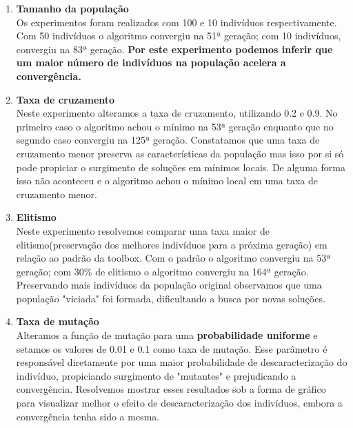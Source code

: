 \documentclass[a4paper, 12pt]{article}
\begin{document}
		\begin{enumerate}[label=\alph*)]
			\item \textbf{Tamanho da população}\\
			Os experimentos foram realizados com 100 e 10 indivíduos respectivamente.  Com 50 indivíduos o algoritmo convergiu na 51ª geração;  com 10 indivíduos, convergiu na 83ª geração.  \textbf{Por este experimento podemos inferir que um maior número de indivíduos na população acelera a convergência.}
			\item \textbf{Taxa de cruzamento}\\
			Neste experimento alteramos a taxa de cruzamento, utilizando 0.2 e 0.9.  No primeiro caso o algoritmo achou o mínimo na 53ª geração enquanto que no segundo caso convergiu na 125ª geração.  Constatamos que uma taxa de cruzamento menor preserva as características da população mas isso por si só pode propiciar o surgimento de soluções em mínimos locais.  De alguma forma isso não aconteceu e o algoritmo achou o mínimo local em uma taxa de cruzamento menor.
			\item \textbf{Elitismo}\\
			Neste experimento resolvemos comparar uma taxa maior de elitismo(preservação dos melhores indivíduos para a próxima geração) em relação ao padrão da toolbox.  Com o padrão o algoritmo convergiu na 53ª geração;  com 30\% de elitismo o algoritmo convergiu na 164ª geração.  Preservando mais indivíduos da população original observamos que uma população "viciada" foi formada, dificultando a busca por novas soluções.
			\item \textbf{Taxa de mutação}\\
			Alteramos a função de mutação para uma \textbf{probabilidade uniforme} e setamos os valores de 0.01 e 0.1 como taxa de mutação.  Esse parâmetro é responsável diretamente por uma maior probabilidade de descaracterização do indivíduo, propiciando surgimento de "mutantes" e prejudicando a convergência.  Resolvemos mostrar esses resultados sob a forma de gráfico para visualizar melhor o efeito de descaracterização dos indivíduos, embora a convergência tenha sido a mesma.
				\begin{figure}[H]
					\centering
\end{figure}
\end{enumerate}
\end{document}
